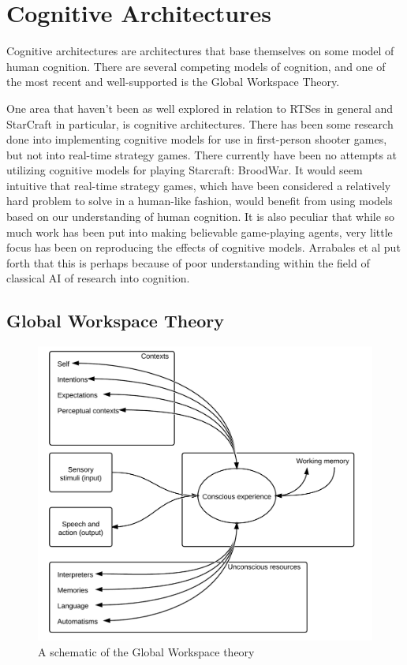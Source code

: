 \section{Cognitive Architectures}
\label{sec:cogarch}
Cognitive architectures are architectures that base themselves on some model of
human cognition. There are several competing models of cognition, and one of
the most recent and well-supported is the Global Workspace Theory.

One area that haven't been as well explored in relation to RTSes in general and
StarCraft in particular, is cognitive architectures.
There has been some research done into implementing cognitive models for use in
first-person shooter games, but not into real-time strategy games. There
currently have been no attempts at utilizing cognitive models for playing
Starcraft: BroodWar. It would seem intuitive that real-time strategy games,
which have been considered a relatively hard problem to solve in a human-like
fashion, would benefit from using models based on our understanding of human
cognition. It is also peculiar that while so much work has been put into making
believable game-playing agents, very little focus has been on reproducing the
effects of cognitive models.  Arrabales et al put forth that this is perhaps
because of poor understanding within the field of classical AI of research into
cognition\cite{arrabales2009gamechars}.

\subsection{Global Workspace Theory}

\begin{figure}[h!tb]
\centering
\includegraphics[scale=1.0]{graphics/globalworkspace.png}
\caption{A schematic of the Global Workspace theory\cite{baars2005gwt}}
\label{fig:gwt}
\end{figure}

